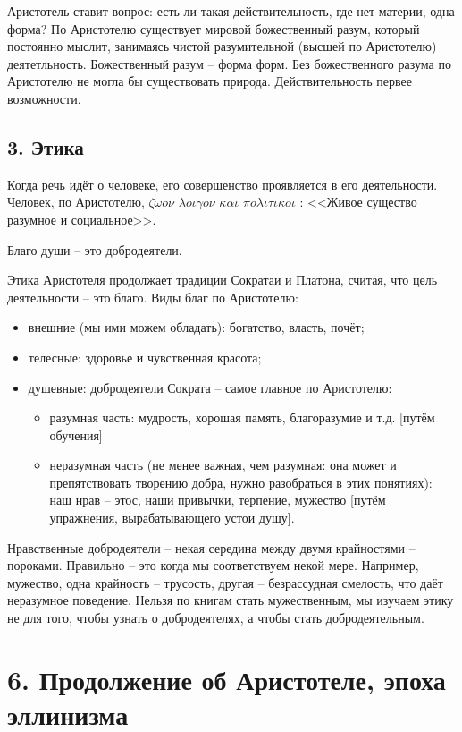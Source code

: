 \documentclass[a4paper, 12pt]{article} %
\begin{document}
Аристотель ставит вопрос: есть ли такая действительность, где нет материи, одна форма? По Аристотелю существует мировой божественный разум, который постоянно мыслит, занимаясь чистой разумительной (высшей по Аристотелю) деятетльность. Божественный разум -- форма форм. Без божественного разума по Аристотелю не могла бы существовать природа. Действительность первее возможности.

\subsection*{3. Этика}

Когда речь идёт о человеке, его совершенство проявляется в его деятельности. Человек, по Аристотелю, $\zeta \omega o \nu$ $\lambda o \iota \gamma o \nu$ $\kappa  \alpha \iota$ $\pi o \lambda \iota \tau \iota \kappa o \iota $ : <<Живое существо разумное и социальное>>. 

Благо души -- это добродеятели.

Этика Аристотеля продолжает традиции Сократаи и Платона, считая, что цель деятельности -- это благо. Виды благ по Аристотелю:
\begin{itemize}
\item внешние (мы ими можем обладать): богатство, власть, почёт;
\item телесные: здоровье и чувственная красота;
\item душевные: добродеятели Сократа -- самое главное по Аристотелю:
\begin{itemize}
\item разумная часть: мудрость, хорошая память, благоразумие и т.д. [путём обучения]
\item неразумная часть (не менее важная, чем разумная: она может и препятствовать творению добра, нужно разобраться в этих понятиях): наш нрав -- этос, наши привычки, терпение, мужество [путём упражнения, вырабатывающего устои душу].
\end{itemize}
\end{itemize}
Нравственные добродеятели -- некая середина между двумя крайностями -- пороками. Правильно -- это когда мы соответствуем некой мере. Например, мужество, одна крайность -- трусость, другая -- безрассудная смелость, что даёт неразумное поведение. Нельзя по книгам стать мужественным, мы изучаем этику не для того, чтобы узнать о добродеятелях, а чтобы стать добродеятельным.


\section*{6. Продолжение об Аристотеле, эпоха эллинизма}
\end{document}
